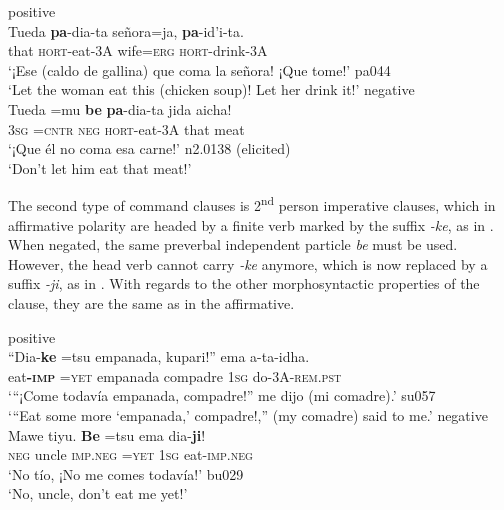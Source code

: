 \documentclass[output=paper,draft,draftmode,colorlinks,citecolor=brown]{langscibook}
\begin{document}
\begin{exe}\ex\label{ex:tacana-hortative}
\begin{xlist}
\ex\label{ex:tacana-hortative-positive} positive\\
\gll {}Tueda \textbf{pa}-dia-ta señora=ja,
\textbf{pa}-id'i-ta.\\
that \textsc{hort}-eat-3A wife\textsc{=erg} \textsc{hort-}drink-3A\\
\glt `¡Ese (caldo de gallina) que coma la señora! ¡Que tome!' pa044\\
‘Let the woman eat this (chicken soup)! Let her drink it!'
\ex\label{ex:tacana-hortative-negative} negative\\
\gll {}Tueda =mu \textbf{be} \textbf{pa}-dia-ta jida aicha{\cb}!\\
3\textsc{sg} =\textsc{cntr} \textsc{neg} \textsc{hort-}eat-3A that meat\\
\glt `¡Que él no coma esa carne!' n2.0138 (elicited)\\
`Don't let him eat that meat!'
\end{xlist}\end{exe}

The second type of command clauses is 2\textsuperscript{nd} person
imperative clauses, which in affirmative polarity are headed by a finite
verb marked by the suffix \textit{-ke}, as in
. When negated, the
same preverbal independent particle \textit{be} must be used.
However, the head verb cannot carry \textit{-ke} anymore, which is now
replaced by a suffix \textit{-ji}, as in
. With regards to the other morphosyntactic properties of the clause, they are the same as in the affirmative.

\begin{exe}\ex\label{ex:tacana-imperative} 
\begin{xlist}
\ex\label{ex:tacana-imperative-positive} positive\\
\gll ``Dia-\textbf{ke}  =tsu  empanada,  kupari!''  ema  a-ta-idha.\\
    eat\textbf{-\textsc{imp}}  =\textsc{yet}  empanada  compadre
    1\textsc{sg}  do-3A\textsc{-rem.pst}\\
\glt `{}``¡Come todavía empanada, compadre!'' me dijo (mi comadre).' su057\\
`{}``Eat some more `empanada,' compadre!,'' (my comadre) said to me.'
\ex\label{ex:tacana-imperative-negative} negative\\
\gll
Mawe  tiyu.  \textbf{Be}  =tsu  ema  dia-\textbf{ji}!\\
\textsc{neg}  uncle  \textsc{imp.neg}  =\textsc{yet}  1\textsc{sg}
eat-\textsc{imp.neg}\\
\glt `No tío, ¡No me comes todavía!' bu029\\
`No, uncle, don't eat me yet!'
\end{xlist}\end{exe}
\end{document}
